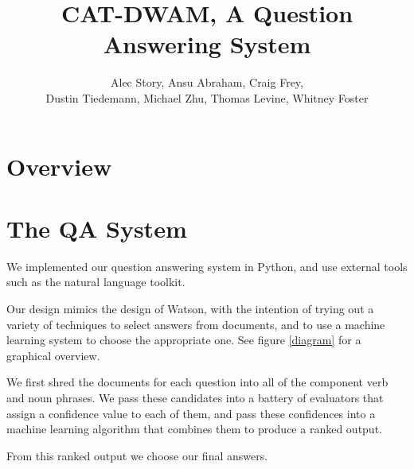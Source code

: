\documentclass{article}
\title{CAT-DWAM, A Question Answering System}
\author{
Alec Story,
Ansu Abraham,
Craig Frey,\\
Dustin Tiedemann,
Michael Zhu,
Thomas Levine,
Whitney Foster\\
}
\begin{document}
\maketitle

\section{Overview}


\section{The QA System}

We implemented our question answering system in Python, and use external
tools such as the natural language toolkit.

Our design mimics the design of Watson, with the intention of trying out a
variety of techniques to select answers from documents, and to use a machine
learning system to choose the appropriate one.  See figure \ref{diagram} for
a graphical overview.

We first shred the documents for each question into all of the component verb
and noun phrases.  We pass these candidates into a battery of evaluators that
assign a confidence value to each of them, and pass these confidences into a
machine learning algorithm that combines them to produce a ranked output.

From this ranked output we choose our final answers.
\end{document}
